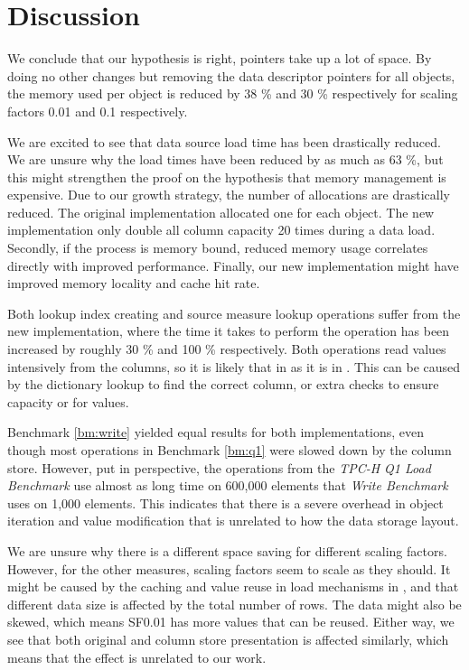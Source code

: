 \section{Discussion}
\label{sec:Discussion}
We conclude that our hypothesis is right, pointers take up a lot of space. By doing no other changes but removing the data descriptor pointers for all objects, the memory used per object is reduced by 38 \% and 30 \% respectively for scaling factors 0.01 and 0.1 respectively. 

We are excited to see that data source load time has been drastically reduced. We are unsure why the load times have been reduced by as much as 63 \%, but this might strengthen the proof on the hypothesis that memory management is expensive. Due to our growth strategy, the number of allocations are drastically reduced. The original implementation allocated one  for each object. The new implementation only double all column capacity 20 times during a data load. Secondly, if the process is memory bound, reduced memory usage correlates directly with improved performance. Finally, our new implementation might have improved memory locality and cache hit rate. 

Both lookup index creating and source measure lookup operations suffer from the new implementation, where the time it takes to perform the operation has been increased by roughly 30 \% and 100 \% respectively. Both operations read values intensively from the columns, so it is likely that  in  as it is in . This can be caused by the dictionary lookup to find the correct column, or extra checks to ensure capacity or for  values.

Benchmark \ref{bm:write} yielded equal results for both implementations, even though most operations in Benchmark \ref{bm:q1} were slowed down by the column store. However, put in perspective, the operations from the \textit{TPC-H Q1 Load Benchmark} use almost as long time on 600,000 elements that \textit{Write Benchmark} uses on 1,000 elements. This indicates that there is a severe overhead in object iteration and value modification that is unrelated to how the data storage layout.

We are unsure why there is a different space saving for different scaling factors. However, for the other measures, scaling factors seem to scale as they should. It might be caused by the caching and value reuse in load mechanisms in \gap, and that different data size is affected by the total number of rows. The data might also be skewed, which means SF0.01 has more values that can be reused. Either way, we see that both original and column store presentation is affected similarly, which means that the effect is unrelated to our work.


